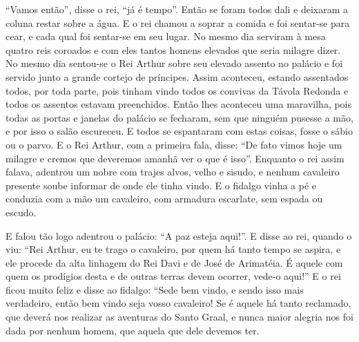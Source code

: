 “Vamos então”, disse o rei, “já é tempo”. Então se foram todos dali e deixaram a
coluna restar sobre a água. E o rei chamou a soprar a comida e foi sentar-se
para cear, e cada qual foi sentar-se em seu lugar. No mesmo dia serviram à mesa
quatro reis coroados e com eles tantos homens elevados que seria milagre dizer.
No mesmo dia sentou-se o Rei Arthur sobre seu elevado assento no palácio e foi
servido junto a grande cortejo de príncipes. Assim aconteceu, estando
assentados todos, por toda parte, pois tinham vindo todos os convivas da Távola
Redonda e todos os assentos estavam preenchidos. Então lhes aconteceu uma
maravilha, pois todas as portas e janelas do palácio se fecharam, sem que
ninguém pusesse a mão, e por isso o salão escureceu. E todos se espantaram com
estas coisas, fosse o sábio ou o parvo. E o Rei Arthur, com a primeira fala,
disse: “De fato vimos hoje um milagre e cremos que deveremos amanhã ver o que é
isso”. Enquanto o rei assim falava, adentrou um nobre com trajes alvos, velho e
sisudo, e nenhum cavaleiro presente soube informar de onde ele tinha vindo. E o
fidalgo vinha a pé e conduzia com a mão um cavaleiro, com armadura escarlate,
sem espada ou escudo. 

E falou tão logo adentrou o palácio: “A paz esteja aqui!”. E disse ao rei,
quando o viu: “Rei Arthur, eu te trago o cavaleiro, por quem há tanto tempo se
aspira, e ele procede da alta linhagem do Rei Davi e de José de Arimatéia. É
aquele com quem os prodígios desta e de outras terras devem ocorrer, vede-o
aqui!” E o rei ficou muito feliz e disse ao fidalgo: “Sede bem vindo, e sendo
isso mais verdadeiro, então bem vindo seja vosso cavaleiro! Se é aquele há
tanto reclamado, que deverá nos realizar as aventuras do Santo Graal, e nunca
maior alegria nos foi dada por nenhum homem, que aquela que dele devemos ter. 


